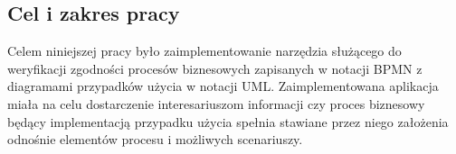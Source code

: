 \subsection{Cel i zakres pracy}
\label{subsec:cel}
Celem niniejszej pracy było zaimplementowanie narzędzia służącego do weryfikacji zgodności procesów biznesowych zapisanych w notacji BPMN z diagramami przypadków użycia w notacji UML. Zaimplementowana aplikacja miała na celu dostarczenie interesariuszom informacji czy proces biznesowy będący implementacją przypadku użycia spełnia stawiane przez niego założenia odnośnie elementów procesu i możliwych scenariuszy.


